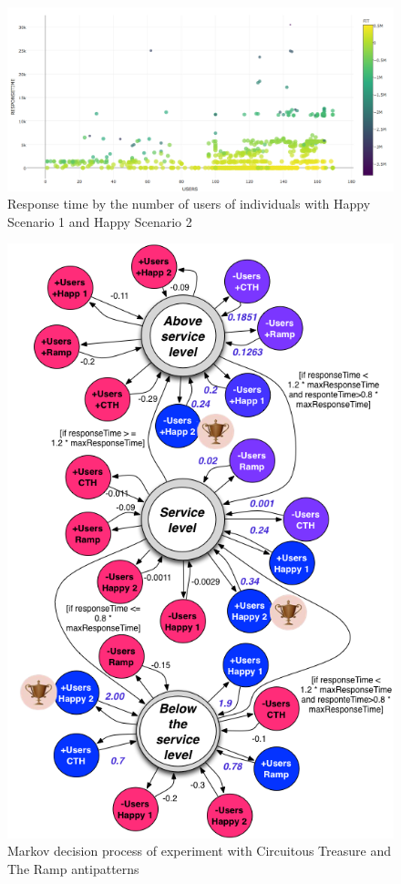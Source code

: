 \documentclass{bmcart}
\begin{document}
\begin{backmatter}
\begin{figure}[h!]
\centering
\includegraphics{./images/experiment1-7.png}
\caption{Response time by the number of users of individuals with Happy Scenario 1 and Happy Scenario 2}
\label{fig:responsetimegenerationalltests1}
\end{figure}
\begin{figure}[h]
\centering
\includegraphics{./images/mdpexperiment.png}
\caption{Markov decision process of experiment with Circuitous Treasure and The Ramp antipatterns}
\label{fig:mdpexperiment1}
\end{figure}


\end{backmatter}
\end{document}
